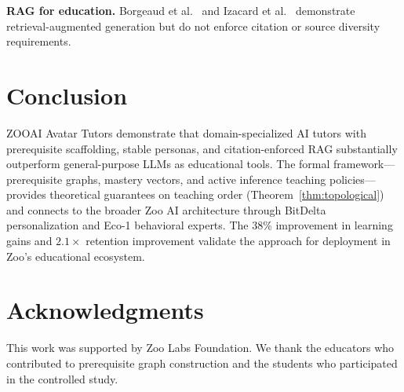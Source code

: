 \documentclass[11pt,letterpaper]{article}
\begin{document}
\textbf{RAG for education.} Borgeaud et al.~\cite{borgeaud2022retro} and Izacard et al.~\cite{izacard2022atlas} demonstrate retrieval-augmented generation but do not enforce citation or source diversity requirements.

\section{Conclusion}

ZOOAI Avatar Tutors demonstrate that domain-specialized AI tutors with prerequisite scaffolding, stable personas, and citation-enforced RAG substantially outperform general-purpose LLMs as educational tools. The formal framework---prerequisite graphs, mastery vectors, and active inference teaching policies---provides theoretical guarantees on teaching order (Theorem~\ref{thm:topological}) and connects to the broader Zoo AI architecture through BitDelta personalization and Eco-1 behavioral experts. The 38\% improvement in learning gains and $2.1\times$ retention improvement validate the approach for deployment in Zoo's educational ecosystem.

\section*{Acknowledgments}

This work was supported by Zoo Labs Foundation. We thank the educators who contributed to prerequisite graph construction and the students who participated in the controlled study.
\end{document}
